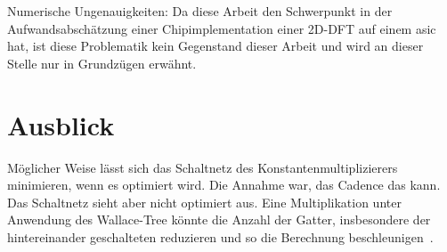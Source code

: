 
 Numerische Ungenauigkeiten: Da diese Arbeit den Schwerpunkt in der Aufwandsabschätzung einer Chipimplementation einer 2D-DFT auf einem \gls{asic} hat, ist diese Problematik kein Gegenstand dieser Arbeit und
wird an dieser Stelle nur in Grundzügen erwähnt. %
 
 
 \section{Ausblick}
 Möglicher Weise lässt sich das Schaltnetz des Konstantenmultiplizierers minimieren, wenn es optimiert wird. Die Annahme war, das Cadence das kann. Das Schaltnetz sieht aber nicht
 optimiert aus. Eine Multiplikation unter Anwendung des Wallace-Tree könnte die Anzahl der Gatter, insbesondere der hintereinander geschalteten reduzieren und so die Berechnung
 beschleunigen~\autocite[8-10]{jdrechsler2008binMultWerke}.